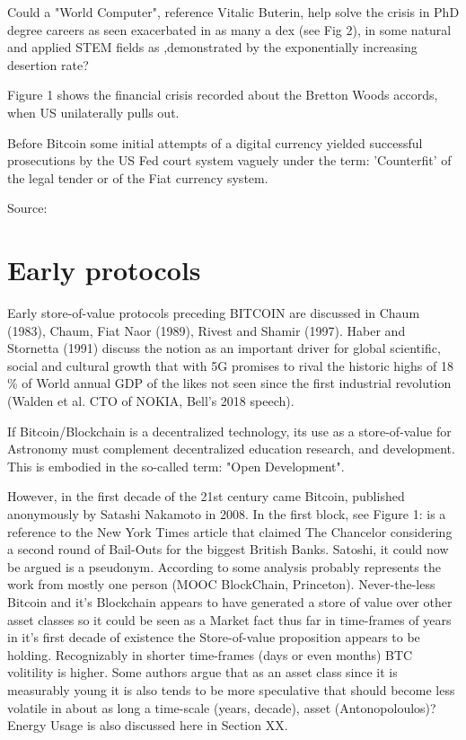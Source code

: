 \documentclass[final,5p,times,twocolumn,authoryear]{elsarticle}
\begin{document}
 
Could a "World Computer", reference Vitalic Buterin, help solve the crisis in PhD degree careers as seen exacerbated in as many a dex (see Fig 2), in some natural and applied STEM fields as ,demonstrated by the exponentially increasing desertion rate?

Figure 1 shows the financial crisis recorded about the Bretton Woods accords, when US unilaterally pulls out.

Before Bitcoin some initial attempts of a digital currency yielded successful prosecutions by the US Fed court system vaguely under the term: 'Counterfit' of the legal tender or of the Fiat currency system. 

Source:  
 
\section{Early protocols}
\label{sec:btc3}

Early store-of-value protocols preceding BITCOIN are discussed in Chaum (1983), Chaum, Fiat Naor (1989), Rivest and Shamir (1997). Haber and Stornetta (1991) discuss the notion as an important driver for global scientific, social and cultural growth that with 5G promises to rival the historic highs of 18 \% of World annual GDP of the likes not seen since the first industrial revolution (Walden et al. CTO of NOKIA, Bell's 2018 speech).

If Bitcoin/Blockchain is a decentralized technology, its use as a store-of-value for Astronomy must complement decentralized education research, and development. This is embodied in the so-called term: "Open Development".

 
However, in the first decade of the 21st century came Bitcoin, published anonymously by Satashi Nakamoto in 2008.  In the first block, see Figure 1: is a reference to the New York Times article that claimed The Chancelor considering a second round of Bail-Outs for the biggest British Banks. Satoshi, it could now be argued is a pseudonym. According to some analysis probably represents the work from mostly one person (MOOC BlockChain, Princeton). Never-the-less Bitcoin and it's Blockchain appears to have generated a store of value over other asset classes so it could be seen as a Market fact thus far in time-frames of years in it's first decade of existence the Store-of-value proposition appears to be holding. Recognizably in shorter time-frames (days or even months) BTC volitility is higher. Some authors argue that as an asset class since it is measurably young it is also tends to be more speculative that should become less volatile in about as long a time-scale (years, decade), asset (Antonopoloulos)? Energy Usage is also discussed here in Section XX. 
 
\end{document}
